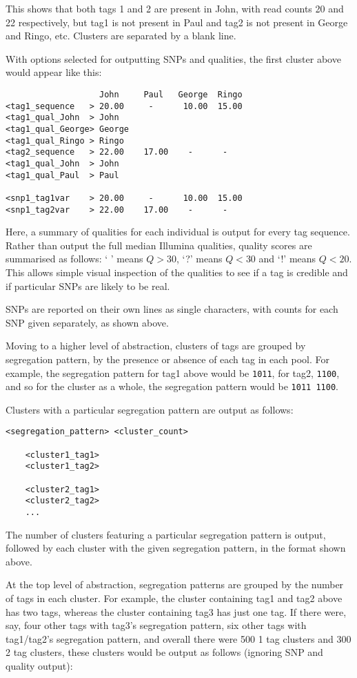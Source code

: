 \documentclass[a4paper]{article}
\begin{document}
This shows that both tags 1 and 2 are present in John, with read counts 20 and 22 respectively, but tag1 is not present in Paul and tag2 is not present in George and Ringo, etc. Clusters are separated by a blank line.

With options selected for outputting SNPs and qualities, the first cluster above would appear like this:

\begin{verbatim}
                   John     Paul   George  Ringo
<tag1_sequence   > 20.00     -      10.00  15.00
<tag1_qual_John  > John
<tag1_qual_George> George
<tag1_qual_Ringo > Ringo
<tag2_sequence   > 22.00    17.00    -      -
<tag1_qual_John  > John
<tag1_qual_Paul  > Paul

<snp1_tag1var    > 20.00     -      10.00  15.00
<snp1_tag2var    > 22.00    17.00    -      -
\end{verbatim}

Here, a summary of qualities for each individual is output for every tag sequence. Rather than output the full median Illumina qualities, quality scores are summarised as follows: ` ' means $Q>30$, `?' means $Q<30$ and `!' means $Q<20$. This allows simple visual inspection of the qualities to see if a tag is credible and if particular SNPs are likely to be real.

SNPs are reported on their own lines as single characters, with counts for each SNP given separately, as shown above.

Moving to a higher level of abstraction, clusters of tags are grouped by segregation pattern, by the presence or absence of each tag in each pool. For example, the segregation pattern for tag1 above would be \verb|1011|, for tag2, \verb|1100|, and so for the cluster as a whole, the segregation pattern would be \verb|1011 1100|.

Clusters with a particular segregation pattern are output as follows:

\begin{verbatim}
<segregation_pattern> <cluster_count>
    
    <cluster1_tag1>
    <cluster1_tag2>
    
    <cluster2_tag1>
    <cluster2_tag2>
    ...
\end{verbatim}
The number of clusters featuring a particular segregation pattern is output, followed by each cluster with the given segregation pattern, in the format shown above.

At the top level of abstraction, segregation patterns are grouped by the number of tags in each cluster. For example, the cluster containing tag1 and tag2 above has two tags, whereas the cluster containing tag3 has just one tag. If there were, say, four other tags with tag3's segregation pattern, six other tags with tag1/tag2's segregation pattern, and overall there were 500 1 tag clusters and 300 2 tag clusters, these clusters would be output as follows (ignoring SNP and quality output):
\end{document}
